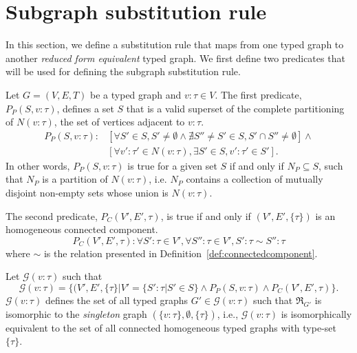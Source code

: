 \documentclass[preprint,12pt]{elsarticle}
\theoremstyle{plain}
\newcommand\tyv[2]{#1\!\!:\!\!#2}
\begin{document}

\section{Subgraph substitution rule}\label{sec:substitution}

In this section, we define a substitution rule that maps from
one typed graph to another \textit{reduced form equivalent} typed graph.
We first define two predicates that will be used for defining the 
subgraph substitution rule.

Let $G = (V,E,T)$ be a typed graph and $\tyv{v}{\tau}\in V$.
The first predicate, $P_P(S, \tyv{v}{\tau})$, defines a set $S$ that is a valid superset of the complete partitioning of $N(\tyv{v}{\tau})$,
the set of vertices adjacent to $\tyv{v}{\tau}$.
\begin{equation*}
\begin{split}
P_P(S, \tyv{v}{\tau}): &[\forall S'\in S, S'\neq\emptyset \wedge 
  \nexists S''\neq S' \in S, S'\cap S''\neq\emptyset]\wedge \\
  &[\forall \tyv{v'}{\tau'}\in N(\tyv{v}{\tau}), \exists S'\in S, \tyv{v'}{\tau'}\in S'].
\end{split}
\end{equation*}
In other words,
$P_P(S, \tyv{v}{\tau})$ is true for a given set $S$
if and only if
$N_P\subseteq S$, such that $N_P$ is a partition of $N(\tyv{v}{\tau})$,
i.e. $N_P$ contains 
a collection of mutually disjoint non-empty sets whose union is $N(\tyv{v}{\tau})$.

The second predicate, $P_C(V',E',\tau)$, is true if and only if $(V',E',\{\tau\})$ is an 
homogeneous connected component.
\[
P_C(V',E',\tau): \forall \tyv{S'}{\tau}\in V', \forall \tyv{S''}{\tau}\in V',
    \tyv{S'}{\tau}\sim\tyv{S''}{\tau}
\]
where $\sim$ is the relation presented in Definition~\ref{def:connectedcomponent}.

Let $\mathcal{G}(\tyv{v}{\tau})$ such that
\[
\mathcal{G}(\tyv{v}{\tau}) = \{(V',E',\{\tau\}|
    V'=\{\tyv{S'}{\tau}|S'\in S\}\wedge P_P(S, \tyv{v}{\tau}) \wedge P_C(V',E',\tau)\}.
\]
$\mathcal{G}(\tyv{v}{\tau})$ defines the set of all typed graphs $G'\in\mathcal{G}(\tyv{v}{\tau})$
such that $\Re_{G'}$ is isomorphic to the \textit{singleton} graph $(\{\tyv{v}{\tau}\},\emptyset,\{\tau\})$,
i.e., $\mathcal{G}(\tyv{v}{\tau})$ is isomorphically equivalent to the set of all connected homogeneous typed graphs with type-set $\{\tau\}$.
\end{document}
